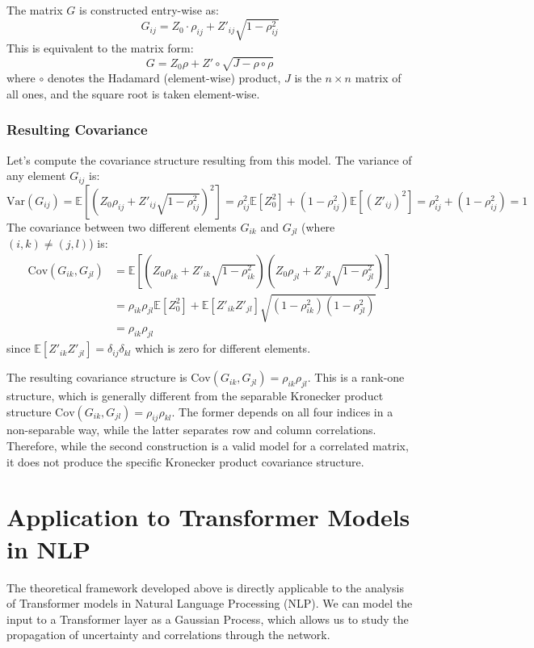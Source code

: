 \documentclass[12pt]{article}
\begin{document}
The matrix $G$ is constructed entry-wise as:
\[
G_{ij} = Z_0 \cdot \rho_{ij} + Z'_{ij} \sqrt{1 - \rho_{ij}^2}
\]
This is equivalent to the matrix form:
\[
G = Z_0 \rho + Z' \circ \sqrt{J - \rho \circ \rho}
\]
where $\circ$ denotes the Hadamard (element-wise) product, $J$ is the $n \times n$ matrix of all ones, and the square root is taken element-wise.

\subsubsection*{Resulting Covariance}
Let's compute the covariance structure resulting from this model. The variance of any element $G_{ij}$ is:
\[
\text{Var}(G_{ij}) = \mathbb{E}[(Z_0 \rho_{ij} + Z'_{ij} \sqrt{1-\rho_{ij}^2})^2] = \rho_{ij}^2 \mathbb{E}[Z_0^2] + (1-\rho_{ij}^2) \mathbb{E}[(Z'_{ij})^2] = \rho_{ij}^2 + (1-\rho_{ij}^2) = 1
\]
The covariance between two different elements $G_{ik}$ and $G_{jl}$ (where $(i,k) \neq (j,l)$) is:
\begin{align*}
\text{Cov}(G_{ik}, G_{jl}) &= \mathbb{E}\left[(Z_0 \rho_{ik} + Z'_{ik} \sqrt{1-\rho_{ik}^2})(Z_0 \rho_{jl} + Z'_{jl} \sqrt{1-\rho_{jl}^2})\right] \\
&= \rho_{ik} \rho_{jl} \mathbb{E}[Z_0^2] + \mathbb{E}[Z'_{ik}Z'_{jl}] \sqrt{(1-\rho_{ik}^2)(1-\rho_{jl}^2)} \\
&= \rho_{ik} \rho_{jl}
\end{align*}
since $\mathbb{E}[Z'_{ik}Z'_{jl}] = \delta_{ij}\delta_{kl}$ which is zero for different elements.

The resulting covariance structure is $\text{Cov}(G_{ik}, G_{jl}) = \rho_{ik} \rho_{jl}$. This is a rank-one structure, which is generally different from the separable Kronecker product structure $\text{Cov}(G_{ik}, G_{jl}) = \rho_{ij} \rho_{kl}$. The former depends on all four indices in a non-separable way, while the latter separates row and column correlations. Therefore, while the second construction is a valid model for a correlated matrix, it does not produce the specific Kronecker product covariance structure.

\section{Application to Transformer Models in NLP}

The theoretical framework developed above is directly applicable to the analysis of Transformer models in Natural Language Processing (NLP). We can model the input to a Transformer layer as a Gaussian Process, which allows us to study the propagation of uncertainty and correlations through the network.
\end{document}
